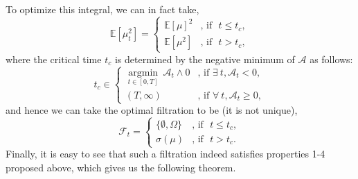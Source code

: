 \documentclass[10pt]{article}
\newtheorem{remark}[theorem]{Remark}
\begin{document}
To optimize this integral, we can in fact take,
$$
\mathbb{E}[\mu_t^2] = \left\{ 
\begin{array}{cc}
    \mathbb{E}[\mu]^2 & \text{, if~~} t \leq t_c, \\ 
    \mathbb{E}[\mu^2] & \text{, if~~} t > t_c,
\end{array} 
\right.
$$
where the critical time $t_c$ is determined by the negative minimum of $\mathcal{A}$ as follows:
$$
t_c \in \left\{
\begin{array}{ll}
    \underset{t \in [0,T]}{\operatorname{argmin}} ~ \mathcal{A}_t \wedge 0 & \text{, if~} \exists ~t, \mathcal{A}_t < 0,  \\ 
    (T,\infty) & \text{, if~} \forall ~t, \mathcal{A}_t \geq 0,
\end{array}
\right.
$$
and hence we can take the optimal filtration to be (it is not unique),
$$
\mathcal{F}_t = \left\{ 
\begin{array}{cc}
    \{\emptyset,\Omega\} & \text{, if~~} t \leq t_c, \\ 
    \sigma(\mu) & \text{, if~~} t > t_c.
\end{array} 
\right.
$$
Finally, it is easy to see that such a filtration indeed satisfies properties 1-4 proposed above, which gives us the following theorem.
\end{document}
